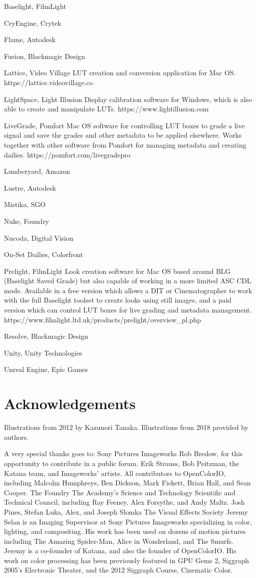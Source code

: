 Baselight, FilmLight

CryEngine, Crytek

Flame, Autodesk

Fusion, Blackmagic Design

Lattice, Video Village
LUT creation and conversion application for Mac OS. https://lattice.videovillage.co

LightSpace, Light Illusion
Display calibration software for Windows, which is also able to create and manipulate LUTs. https://www.lightillusion.com

LiveGrade, Pomfort
Mac OS software for controlling LUT boxes to grade a live signal and save the grades and other metadata to be applied elsewhere. Works together with other software from Pomfort for managing metadata and creating dailies. https://pomfort.com/livegradepro

Lumberyard, Amazon

Lustre, Autodesk

Mistika, SGO

Nuke, Foundry

Nucoda, Digital Vision

On-Set Dailies, Colorfront

Prelight, FilmLight
Look creation software for Mac OS based around BLG (Baselight Saved Grade) but also capable of working in a more limited ASC CDL mode. Available in a free version which allows a DIT or Cinematographer to work with the full Baselight toolset to create looks using still images, and a paid version which can control LUT boxes for live grading and metadata management. https://www.filmlight.ltd.uk/products/prelight/overview_pl.php

Resolve, Blackmagic Design

Unity, Unity Technologies

Unreal Engine, Epic Games

\section{Acknowledgements}
Illustrations from 2012 by Kazunori Tanaka.
Illustrations from 2018 provided by authors.

A very special thanks goes to:
Sony Pictures Imageworks
Rob Bredow, for this opportunity to contribute in a public forum.
Erik Strauss, Bob Peitzman, the Katana team, and Imageworks’ artists.
All contributors to OpenColorIO, including Malcolm Humphreys, Ben Dickson, Mark Fickett, Brian Hall, and Sean Cooper.
The Foundry
The Academy’s Science and Technology Scientific and Technical Council, including Ray Feeney, Alex Forsythe, and Andy Maltz.
Josh Pines, Stefan Luka, Alex, and Joseph Slomka
The Visual Effects Society
Jeremy Selan is an Imaging Supervisor at Sony Pictures Imageworks specializing in color, lighting, and compositing. His work has been used on dozens of motion pictures including The Amazing Spider-Man, Alice in Wonderland, and The Smurfs. Jeremy is a co-founder of Katana, and also the founder of OpenColorIO. His work on color processing has been previously featured in GPU Gems 2, Siggraph 2005's Electronic Theater, and the 2012 Siggraph Course, Cinematic Color.

